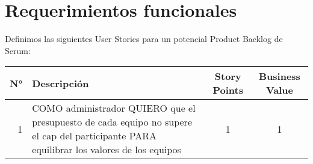 \section{Requerimientos funcionales}

Definimos las siguientes User Stories para un potencial Product Backlog de Scrum:

\begin{center}
  \begin{tabular}{| r | p{10cm} | c | c | }
    \hline
        N° & Descripción & Story Points & Business Value\\  \hline
        1  & COMO administrador QUIERO que el presupuesto de cada equipo no supere el cap del participante PARA equilibrar los valores de los equipos & 1 & 1\\  \hline
  \end{tabular}
\end{center}

